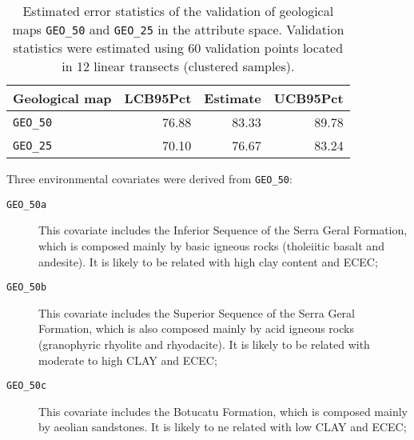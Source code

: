 
\begin{table}[ht]
  \caption{Estimated error statistics of the validation of geological maps \texttt{GEO\_50} and \texttt{GEO\_25} in the attribute space. Validation statistics were estimated using 60 validation points located in 12 linear transects (clustered samples).}
  \label{tab:geology-attr-val}
  \centering
  \begin{tabular}{lrrr}
    \hline
    Geological map        & LCB95Pct & Estimate & UCB95Pct \\
    \hline
    \texttt{GEO\_50}      & 76.88    & 83.33    & 89.78    \\
    \texttt{GEO\_25}      & 70.10    & 76.67    & 83.24    \\
    \hline
  \end{tabular}
\end{table}

Three environmental covariates were derived from \texttt{GEO\_50}:

\begin{description}
  \item[\texttt{GEO\_50a}] This covariate includes the Inferior Sequence of the Serra Geral Formation, which is composed mainly by basic igneous rocks (tholeiitic basalt and andesite). It is likely to be related with high clay content and ECEC;
 
  \item[\texttt{GEO\_50b}] This covariate includes the Superior Sequence of the Serra Geral Formation, which is also composed mainly by acid  igneous rocks (granophyric rhyolite and rhyodacite). It is likely to be related with moderate to high CLAY and ECEC;
 
  \item[\texttt{GEO\_50c}] This covariate includes the Botucatu Formation, which is composed mainly by aeolian sandstones. It is likely to ne related with low CLAY and ECEC;
\end{description}

